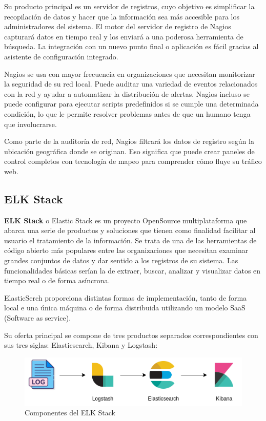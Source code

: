 Su producto principal es un servidor de registros, cuyo objetivo es simplificar la recopilación de datos y hacer que la información sea más accesible para los administradores del sistema. El motor del servidor de registro de Nagios capturará datos en tiempo real y los enviará a una poderosa herramienta de búsqueda. La integración con un nuevo punto final o aplicación es fácil gracias al asistente de configuración integrado.

Nagios se usa con mayor frecuencia en organizaciones que necesitan monitorizar la seguridad de su red local. Puede auditar una variedad de eventos relacionados con la red y ayudar a automatizar la distribución de alertas. Nagios incluso se puede configurar para ejecutar scripts predefinidos si se cumple una determinada condición, lo que le permite resolver problemas antes de que un humano tenga que involucrarse.

Como parte de la auditoría de red, Nagios filtrará los datos de registro según la ubicación geográfica donde se originan. Eso significa que puede crear paneles de control completos con tecnología de mapeo para comprender cómo fluye su tráfico web.

\subsection{ELK Stack}

\textbf{ELK Stack} o Elastic Stack es un proyecto OpenSource multiplataforma que abarca una serie de productos y soluciones que tienen como finalidad facilitar al usuario el tratamiento de la información. Se trata de una de las herramientas de código abierto más populares entre las organizaciones que necesitan examinar grandes conjuntos de datos y dar sentido a los registros de su sistema. Las funcionalidades básicas serían la de extraer, buscar, analizar y visualizar datos en tiempo real o de forma asíncrona.

ElasticSerch proporciona distintas formas de implementación, tanto de forma local e una única máquina o de forma distribuida utilizando un modelo SaaS (Software as service).

Su oferta principal se compone de tres productos separados correspondientes con sus tres siglas: Elasticsearch, Kibana y Logstash:

\begin{figure}[H]
\centerline{\includegraphics[width=15cm]{figuras/elkstack.png}}
\caption{Componentes del ELK Stack}
\label{enlace1}
\end{figure}

